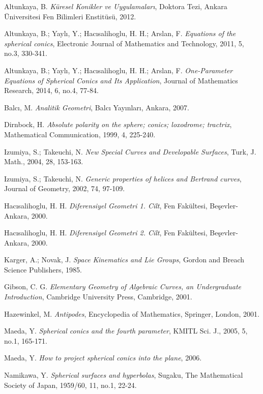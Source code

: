\documentclass[a4paper,12pt]{article}
\begin{document}
 \begin{thebibliography}{99}

 Altunkaya, B. \textit{Küresel Konikler ve Uygulamaları}, Doktora Tezi, Ankara Üniversitesi Fen Bilimleri Enstitüsü, 2012.

 Altunkaya, B.; Yaylı, Y.; Hacısalihoglu, H. H.; Arslan, F. \textit{Equations of the spherical conics}, Electronic Journal of Mathematics and Technology, 2011, 5, no.3, 330-341.

 Altunkaya, B.; Yaylı, Y.; Hacısalihoglu, H. H.; Arslan, F. \textit{One-Parameter Equations of Spherical Conics and Its Application}, Journal of Mathematics Research, 2014, 6, no.4, 77-84.

 Balcı, M. \textit{Analitik Geometri}, Balcı Yayınları, Ankara, 2007.

 Dirnbock, H. \textit{Absolute polarity on the sphere; conics; loxodrome; tractrix}, Mathematical Communication, 1999, 4, 225-240.

 Izumiya, S.; Takeuchi, N. \textit{New Special Curves and Developable Surfaces}, Turk, J. Math., 2004, 28, 153-163.

 Izumiya, S.; Takeuchi, N. \textit{Generic properties of helices and Bertrand curves}, Journal of Geometry, 2002, 74, 97-109.

 Hacısalihoglu, H. H. \textit{Diferensiyel Geometri 1. Cilt}, Fen Fakültesi, Beşevler-Ankara, 2000.

 Hacısalihoglu, H. H. \textit{Diferensiyel Geometri 2. Cilt}, Fen Fakültesi, Beşevler-Ankara, 2000.

 Karger, A.; Novak, J. \textit{Space Kinematics and Lie Groups}, Gordon and Breach Science Publishers, 1985.

 Gibson, C. G. \textit{Elementary Geometry of Algebraic Curves, an Undergraduate Introduction}, Cambridge University Press, Cambridge, 2001.

 Hazewinkel, M. \textit{Antipodes}, Encyclopedia of Mathematics, Springer, London, 2001.

 Maeda, Y. \textit{Spherical conics and the fourth parameter}, KMITL Sci. J., 2005, 5, no.1, 165-171.

 Maeda, Y. \textit{How to project spherical conics into the plane}, 2006.

 Namikawa, Y. \textit{Spherical surfaces and hyperbolas}, Sugaku, The Mathematical Society of Japan, 1959/60, 11, no.1, 22-24.


\end{thebibliography}
\end{document}
